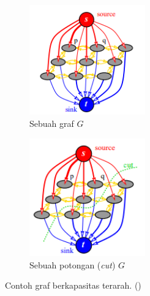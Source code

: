 \begin{figure}[H]
  \centering
    \begin{subfigure}{.5\textwidth}
      \centering{}
      \includegraphics[width=0.55\textwidth]{gambar/graph-A.png}
      \caption{Sebuah graf \(G\)}
    \end{subfigure}%
    \begin{subfigure}{.5\textwidth}
      \centering{}
      \includegraphics[width=0.55\textwidth]{gambar/cut-A.png}
      \caption{Sebuah potongan (\emph{cut}) \(G\)}
    \end{subfigure}  
  \caption{
    Contoh graf berkapasitas terarah. (\cite{Boykov:2004})
    }
  \label{img:graf_berarah}

\end{figure}

